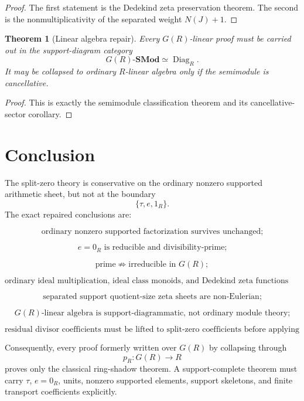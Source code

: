 \documentclass[11pt]{article}
\newtheorem{theorem}{Theorem}[section]
\newcommand{\Diag}{\operatorname{Diag}}
\begin{document}
\begin{proof}
The first statement is the Dedekind zeta preservation theorem. The second is the nonmultiplicativity of the separated weight \(N(J)+1\).
\end{proof}

\begin{theorem}[Linear algebra repair]
Every \(G(R)\)-linear proof must be carried out in the support-diagram category
\[
G(R)\text{-}\mathbf{SMod}
\simeq
\Diag_R.
\]
It may be collapsed to ordinary \(R\)-linear algebra only if the semimodule is cancellative.
\end{theorem}

\begin{proof}
This is exactly the semimodule classification theorem and its cancellative-sector corollary.
\end{proof}

\section{Conclusion}

The split-zero theory is conservative on the ordinary nonzero supported arithmetic sheet, but not at the boundary
\[
\{\tau,e,1_R\}.
\]
The exact repaired conclusions are:

\[
\boxed{
\text{ordinary nonzero supported factorization survives unchanged;}
}
\]

\[
\boxed{
e=0_R\text{ is reducible and divisibility-prime;}
}
\]

\[
\boxed{
\text{prime}\not\Rightarrow\text{irreducible in }G(R);
}
\]

\[
\boxed{
\text{ordinary ideal multiplication, ideal class monoids, and Dedekind zeta functions are preserved;}
}
\]

\[
\boxed{
\text{separated support quotient-size zeta sheets are non-Eulerian;}
}
\]

\[
\boxed{
G(R)\text{-linear algebra is support-diagrammatic, not ordinary module theory;}
}
\]

\[
\boxed{
\text{residual divisor coefficients must be lifted to split-zero coefficients before applying support logic.}
}
\]

Consequently, every proof formerly written over \(G(R)\) by collapsing through
\[
p_R:G(R)\to R
\]
proves only the classical ring-shadow theorem. A support-complete theorem must carry \(\tau\), \(e=0_R\), units, nonzero supported elements, support skeletons, and finite transport coefficients explicitly.
\end{document}
